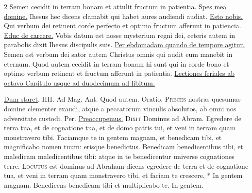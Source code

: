 \begin{multicols*}{2}
 Semen cecidit in terram bonam et attulit fructum in patientia. \R \hyperlink{spes-mea}{Spes mea domine.}
 Ihesus hec dicens clamabit qui habet aures audiendi audiat. \R \hyperlink{esto-nobis}{Esto nobis.}
 Qui verbum dei retinent corde perfecto et optimo fructum afferunt in patiencia. \R \hyperlink{educ-de-carcere}{Educ de carcere.}
 Vobis datum est nosse mysterium regni dei, ceteris autem in parabolis dixit Ihesus discipulis suis.
\newline \ul{Per ebdomadam quando de tempore agitur.}
 Semen est verbum dei sator autem Christus omnis qui audit eum manebit in eternum.
 Quod autem cecidit in terram bonam hi sunt qui in corde bono et optimo verbum retinent et fructum afferunt in patientia.
\newline \ul{Lectiones feriales ab octavo Capitulo usque ad duodecimum ad libitum.}
{\color{Red} }
\par {} \R \hyperlink{dum-staret}{Dum staret}. {\color{Red} IIII. Ad Mag. Ant.} Quod autem. {\color{Red} Oratio.} 
\lettrine[lines=2]{\zallmancaps \color{Red} P}{reces} nostras quesumus domine clementer exaudi, atque a peccatorum vinculis absolutos, ab omni nos adversitate custodi. Per.
 \hyperlink{preoccupemus-faciem-invitatorium}{Preoccupemus.}
\lettrine[lines=2]{\zallmancaps \color{Blue} D}{ixit} Dominus ad Abram. Egredere de terra tua, et de cognatione tua, et de domo patris tui, et veni in terram quam monstravero tibi. Faciamque te in gentem magnam, et benedicam tibi, et magnificabo nomen tuum: erisque benedictus. Benedicam benedicentibus tibi, et maledicam maledicentibus tibi: atque in te benedicentur universe cognationes terre. \R
\lettrine[lines=2]{\zallmancaps \color{Red} L}{ocutus} \hypertarget{locutus-est-quinquagesima}{\label{locutus-est-quinquagesima}} est dominus ad Abraham dicens egredere de terra et de cognatione tua, et veni in terram quam monstravero tibi, et faciam te crescere, * In gentem magnam. \V Benedicens benedicam tibi et multiplicabo te. In gentem.

\end{multicols*}

